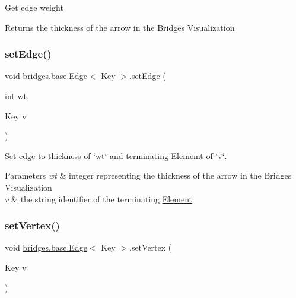 Get edge weight

\begin{DoxyReturn}{Returns}
the thickness of the arrow in the Bridges Visualization 
\end{DoxyReturn}
\hypertarget{classbridges_1_1base_1_1_edge_a02f0ad2a38fff319ccc8e9619f7db7f9}{}\label{classbridges_1_1base_1_1_edge_a02f0ad2a38fff319ccc8e9619f7db7f9} 
\subsubsection{\texorpdfstring{set\+Edge()}{setEdge()}}
{\footnotesize\ttfamily void \hyperlink{classbridges_1_1base_1_1_edge}{bridges.\+base.\+Edge}$<$ Key $>$.set\+Edge (\begin{DoxyParamCaption}\item[{int}]{wt,  }\item[{Key}]{v }\end{DoxyParamCaption})}

Set edge to thickness of \char`\"{}wt\char`\"{} and terminating Elememt of \char`\"{}v\char`\"{}.


\begin{DoxyParams}{Parameters}
{\em wt} & integer representing the thickness of the arrow in the Bridges Visualization \\
\hline
{\em v} & the string identifier of the terminating \hyperlink{classbridges_1_1base_1_1_element}{Element} \\
\hline
\end{DoxyParams}
\hypertarget{classbridges_1_1base_1_1_edge_a596d119b0bcfe8c455acae65832bf25d}{}\label{classbridges_1_1base_1_1_edge_a596d119b0bcfe8c455acae65832bf25d} 
\subsubsection{\texorpdfstring{set\+Vertex()}{setVertex()}}
{\footnotesize\ttfamily void \hyperlink{classbridges_1_1base_1_1_edge}{bridges.\+base.\+Edge}$<$ Key $>$.set\+Vertex (\begin{DoxyParamCaption}\item[{Key}]{v }\end{DoxyParamCaption})}

